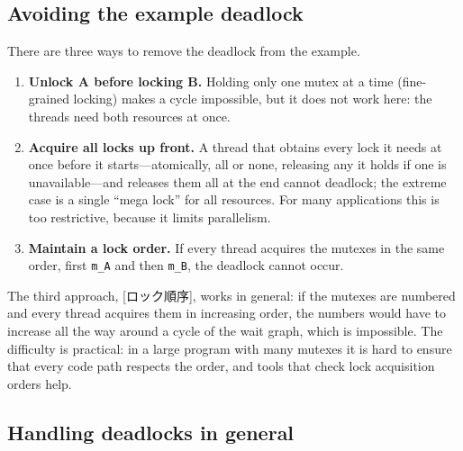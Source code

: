 \documentclass[../main.tex]{subfiles}
\begin{document}
\subsection{Avoiding the example deadlock}

There are three ways to remove the deadlock from the example.
\begin{enumerate}
  \item \textbf{Unlock A before locking B.}  Holding only one mutex at a
    time (fine-grained locking) makes a cycle impossible, but it does not
    work here: the threads need both resources at once.
  \item \textbf{Acquire all locks up front.}  A thread that obtains every
    lock it needs at once before it starts---atomically, all or none,
    releasing any it holds if one is unavailable---and releases them all at
    the end cannot deadlock; the extreme case is a single \enquote{mega
    lock} for all resources.  For many applications this is too restrictive, because it
    limits parallelism.
  \item \textbf{Maintain a lock order.}  If every thread acquires the
    mutexes in the same order, first \texttt{m\_A} and then \texttt{m\_B},
    the deadlock cannot occur.
\end{enumerate}

The third approach, [ロック順序], works in general:
if the mutexes are numbered and every thread acquires them in increasing
order, the numbers would have to increase all the way around a cycle of the
wait graph, which is impossible.  The difficulty is practical: in a large
program with many mutexes it is hard to ensure that every code path
respects the order, and tools that check lock acquisition orders
help.

\subsection{Handling deadlocks in general}
\end{document}
